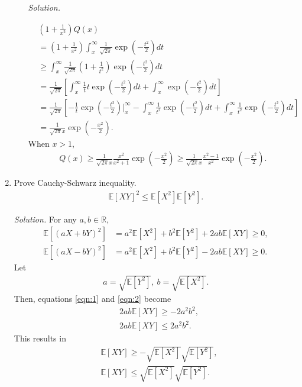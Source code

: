\documentclass{article}
\begin{document}
\begin{enumerate}
\begin{enumerate}
\emph{Solution.}

	\begin{align*}
	&\left(1+\frac{1}{x^2}\right)Q(x)\\
	&=\left(1+\frac{1}{x^2}\right)\int_x^\infty \frac{1}{\sqrt{2\pi}}\exp\left(-\frac{t^2}{2}\right)dt	\\
	&\geq \int_x^\infty \frac{1}{\sqrt{2\pi}} \left(1+\frac{1}{t^2}\right)\exp\left(-\frac{t^2}{2}\right)dt\\
	&=\frac{1}{\sqrt{2\pi}}\left[\int_x^\infty \frac{1}{t}t\exp\left(-\frac{t^2}{2}\right)dt + \int_x^\infty \exp\left(-\frac{t^2}{2}\right)dt \right]\\
	&=\frac{1}{\sqrt{2\pi}}\left[ -\frac{1}{t}\exp\left(-\frac{t^2}{2}\right)\bigg|_x^\infty -\int_x^\infty \frac{1}{t^2}\exp\left(-\frac{t^2}{2}\right)dt +\int_x^\infty \frac{1}{t^2}\exp\left(-\frac{t^2}{2}\right)dt\right]\\
	&=\frac{1}{\sqrt{2\pi}x}\exp\left(-\frac{x^2}{2}\right).
	\end{align*}
When $x>1$,
	\begin{align*}
	Q(x)\geq \frac{1}{\sqrt{2\pi}x}\frac{x^2}{x^2+1}\exp\left(-\frac{x^2}{2}\right)\geq \frac{1}{\sqrt{2\pi}x}\frac{x^2-1}{x^2}\exp\left(-\frac{x^2}{2}\right).	
	\end{align*}






\end{enumerate}
\item Prove Cauchy-Schwarz inequality. 
	\begin{align*}
	\mathbb{E}[XY]^2\leq \mathbb{E}[X^2]\mathbb{E}[Y^2].	
	\end{align*}

\emph{Solution.}
For any $a,b\in\mathbb{R}$,
	\begin{align}
	\mathbb{E}\left[(aX+bY)^2\right]&=a^2\mathbb{E}[X^2]+b^2\mathbb{E}[Y^2]+2ab\mathbb{E}[XY]\geq 0,\label{eqn:1}\\
	\mathbb{E}\left[(aX-bY)^2\right]&=a^2\mathbb{E}[X^2]+b^2\mathbb{E}[Y^2]-2ab\mathbb{E}[XY]\geq 0.\label{eqn:2}
	\end{align}
Let
	\begin{align*}
	a=\sqrt{\mathbb{E}[Y^2]},~b=\sqrt{\mathbb{E}[X^2]}.	
	\end{align*}
Then, equations \eqref{eqn:1} and \eqref{eqn:2} become
	\begin{align*}
	&2ab\mathbb{E}[XY]\geq -2a^2b^2,\\
	&2ab\mathbb{E}[XY]\leq 2a^2b^2.	
	\end{align*}
This results in 
	\begin{align*}
	&\mathbb{E}[XY]\geq -\sqrt{\mathbb{E}[X^2]}\sqrt{\mathbb{E}[Y^2]},\\
	&\mathbb{E}[XY]\leq 	\sqrt{\mathbb{E}[X^2]}\sqrt{\mathbb{E}[Y^2]}.
	\end{align*}


\end{enumerate}
\end{document}
